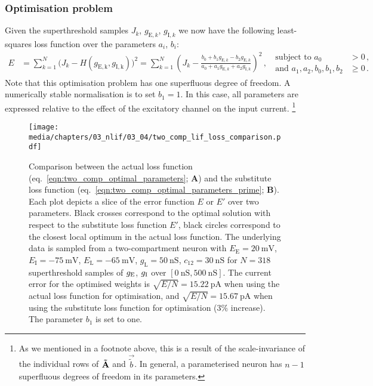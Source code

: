 \subsubsection{Optimisation problem}
Given the superthreshold samples $J_k$, $g_{\mathrm{E}, k}$, $g_{\mathrm{I}, k}$ we now have the following least-squares loss function over the parameters $a_i$, $b_i$:
\begin{align}
	E &=
		\sum_{k = 1}^N \bigl( J_k - H(g_\mathrm{E, k}, g_\mathrm{I, k}) \bigr)^2
	= \sum_{k = 1}^N \left( \! J_k - \frac{b_0 + b_1 g_{\mathrm{E}, k} - b_2 g_{\mathrm{E}, k}}{a_0 + a_1 g_{\mathrm{E}, k} + a_2  g_{\mathrm{I}, k}} \right)^2 \,,
	\;\; \begin{aligned}\text{subject to } a_0 &> 0 \,, \\ \text{and } a_1, a_2, b_0, b_1, b_2 &\geq  0 \,.\end{aligned}
	\label{eqn:two_comp_optimal_parameters}
\end{align}
Note that this optimisation problem has one superfluous degree of freedom.
A numerically stable normalisation is to set $b_1 = 1$.
In this case, all parameters are expressed relative to the effect of the excitatory channel on the input current.%
\footnote{As we mentioned in a footnote above, this is a result of the scale-invariance of the individual rows of $\mathbf{\tilde A}$ and $\vec{\tilde b}$. In general, a parameterised \nlif neuron has $n - 1$ superfluous degrees of freedom in its parameters.}

\begin{figure}
	\centering
	\texttt{[image: media/chapters/03\_nlif/03\_04/two\_comp\_lif\_loss\_comparison.pdf]}
	\caption[Comparison between the actual and substitute loss function.]{Comparison between the actual loss function (eq.~\ref{eqn:two_comp_optimal_parameters}; \textbf{A}) and the substitute loss function (eq.~\ref{eqn:two_comp_optimal_parameters_prime}; \textbf{B}).
	Each plot depicts a slice of the error function $E$ or $E'$ over two parameters.
	Black crosses correspond to the optimal solution with respect to the substitute loss function $E'$, black circles correspond to the closest local optimum in the actual loss function.
	The underlying data is sampled from a two-compartment neuron with  $E_\mathrm{E} = \SI{20}{\milli\volt}$, $E_\mathrm{I} = \SI{-75}{\milli\volt}$, $E_\mathrm{L} = \SI{-65}{\milli\volt}$, $g_\mathrm{L} = \SI{50}{\nano\siemens}$, $c_{12} =\SI{30}{\nano\siemens}$ for $N = 318$ superthreshold samples of $g_\mathrm{E}$, $g_\mathrm{I}$ over $[\SI{0}{\nano\siemens}, \SI{500}{\nano\siemens}]$.
	The \RMSE current error for the optimised weights is $\sqrt{E/N} = \SI{15.22}{\pico\ampere}$ when using the actual loss function for optimisation, and $\sqrt{E/N} = \SI{15.67}{\pico\ampere}$ when using the substitute loss function for optimisation ($3\%$ increase). The parameter $b_1$ is set to one.
	}
	\label{fig:two_comp_lif_loss_comparison}
\end{figure}

